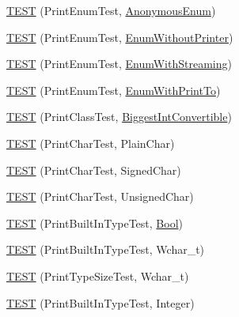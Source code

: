 \begin{DoxyCompactItemize}
\item 
\hyperlink{namespacetesting_1_1gtest__printers__test_ac79ac1529e754dddbaff5ba108ba3de3}{\-T\-E\-S\-T} (\-Print\-Enum\-Test, \hyperlink{gtest-printers__test_8cc_a7a5ee9fe858568a85d80af1312aefb8b}{\-Anonymous\-Enum})
\item 
\hyperlink{namespacetesting_1_1gtest__printers__test_ae435934e9be88c7813ac6aee2ce0ce53}{\-T\-E\-S\-T} (\-Print\-Enum\-Test, \hyperlink{gtest-printers__test_8cc_a404f735da62338180a19ae16f80e09c8}{\-Enum\-Without\-Printer})
\item 
\hyperlink{namespacetesting_1_1gtest__printers__test_a152cda5e11caecc372208103022726d1}{\-T\-E\-S\-T} (\-Print\-Enum\-Test, \hyperlink{gtest-printers__test_8cc_a52d9f846ca7a081ba3acf88dd6cd46dc}{\-Enum\-With\-Streaming})
\item 
\hyperlink{namespacetesting_1_1gtest__printers__test_a171e23e5a52e6b7355c00daf8391ec12}{\-T\-E\-S\-T} (\-Print\-Enum\-Test, \hyperlink{gtest-printers__test_8cc_a904d619d593201ed509be794aed041ec}{\-Enum\-With\-Print\-To})
\item 
\hyperlink{namespacetesting_1_1gtest__printers__test_a46ee2873cfeb51db5f56be0960ce333b}{\-T\-E\-S\-T} (\-Print\-Class\-Test, \hyperlink{classBiggestIntConvertible}{\-Biggest\-Int\-Convertible})
\item 
\hyperlink{namespacetesting_1_1gtest__printers__test_aa0a012b88bd8dee46707bf308aa312d1}{\-T\-E\-S\-T} (\-Print\-Char\-Test, \-Plain\-Char)
\item 
\hyperlink{namespacetesting_1_1gtest__printers__test_a08fe11b61c0ff62931f0172dc05c971b}{\-T\-E\-S\-T} (\-Print\-Char\-Test, \-Signed\-Char)
\item 
\hyperlink{namespacetesting_1_1gtest__printers__test_a54554ba079349cf09dcb6d522cfb70de}{\-T\-E\-S\-T} (\-Print\-Char\-Test, \-Unsigned\-Char)
\item 
\hyperlink{namespacetesting_1_1gtest__printers__test_a6f08c464dc0b8eb822368f552d4467ad}{\-T\-E\-S\-T} (\-Print\-Built\-In\-Type\-Test, \hyperlink{structBool}{\-Bool})
\item 
\hyperlink{namespacetesting_1_1gtest__printers__test_ab567ebd97eff0a4b9a20a5f5cb77d678}{\-T\-E\-S\-T} (\-Print\-Built\-In\-Type\-Test, \-Wchar\-\_\-t)
\item 
\hyperlink{namespacetesting_1_1gtest__printers__test_a705ec4c2886606a22194107397fceea6}{\-T\-E\-S\-T} (\-Print\-Type\-Size\-Test, \-Wchar\-\_\-t)
\item 
\hyperlink{namespacetesting_1_1gtest__printers__test_a278d53e99390c7b31ff531524fe5e86e}{\-T\-E\-S\-T} (\-Print\-Built\-In\-Type\-Test, \-Integer)

\end{DoxyCompactItemize}
